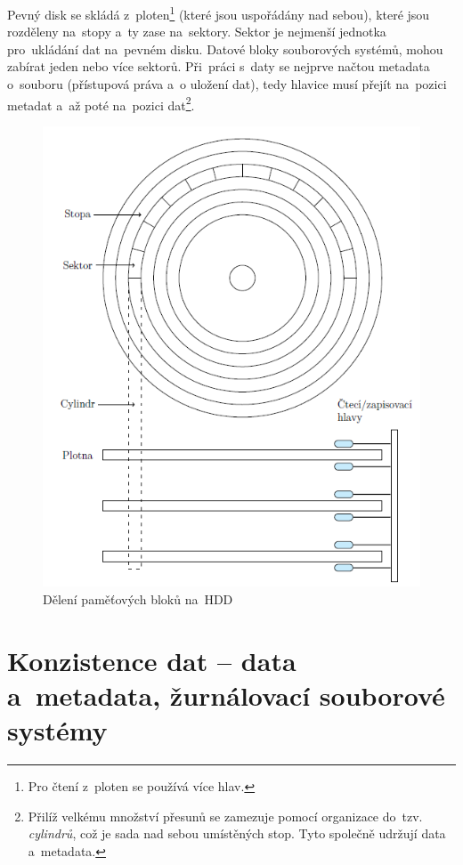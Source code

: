 Pevný disk se skládá z~ploten\footnote{Pro čtení z~ploten se používá více hlav.} (které jsou uspořádány nad sebou), které jsou rozděleny na~stopy a~ty zase na~sektory. Sektor je nejmenší jednotka pro~ukládání dat na~pevném disku. Datové bloky souborových systémů, mohou zabírat jeden nebo více sektorů. Při~práci s~daty se nejprve načtou metadata o~souboru (přístupová práva a~o uložení dat), tedy hlavice musí přejít na~pozici metadat a~až poté na~pozici dat\footnote{Přilíž velkému množství přesunů se zamezuje pomocí organizace do~tzv. \emph{cylindrů}, což je sada nad sebou umístěných stop. Tyto společně udržují data a~metadata.}.

\begin{figure}[ht]
	\centering
	\includegraphics[scale=1]{images/mem_hdd.png}
	\caption{Dělení paměťových bloků na~HDD}
	\label{mem_hdd}
\end{figure}


\clearpage
\section{Konzistence dat -- data a~metadata, žurnálovací souborové systémy}

